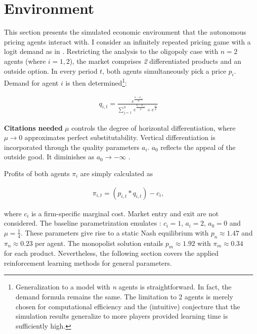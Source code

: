 \section{Environment}\label{enironment}

This section presents the simulated economic environment that the autonomous pricing agents interact with. I consider an infinitely repeated pricing game with a logit demand as in \textcite{calvano_artificial_2019}. Restricting the analysis to the oligopoly case with $n=2$ agents (where $i = 1,2$), the market comprises \emph{2} differentiated products and an outside option. In every period $t$, both agents simultaneously pick a price $p_i$. Demand for agent $i$ is then determined\footnote{Generalization to a model with \emph{n} agents is straightforward. In fact, the demand formula remains the same. The limitation to 2 agents is merely chosen for computational efficiency and the (intuitive) conjecture that the simulation results generalize to more players provided learning time is sufficiently high.}:

\begin{gather}\label{quantity}
q_{i,t}=\frac{e^{\frac{a_i - p_{i,t}}{\mu}}}{\sum_{j=1}^{n}~ e^{\frac{a_j-p_{j,t}}{\mu}}+e^{\frac{a_0}{\mu}}}
\end{gather}

\textbf{Citations needed}
$\mu$ controls the degree of horizontal differentiation, where $\mu \rightarrow 0$ approximates perfect substitutability. Vertical differentiation is incorporated through the quality parameters $a_i$. $a_0$ reflects the appeal of the outside good. It diminishes as $a_0 \rightarrow -\infty$ \parencite{anderson_logit_1992}. 

Profits of both agents $\pi_i$ are simply calculated as

\begin{gather}\label{profit}
\pi_{i,t} = (p_{i,t} * q_{i,t}) - c_i,
\end{gather}

where $c_i$ is a firm-specific marginal cost. Market entry and exit are not considered. The baseline parametrization emulates \textcite{calvano_artificial_2019}:
$c_i = 1$,
$a_i = 2$,
$a_0 = 0$ and
$\mu = \frac{1}{4}$. These parameters give rise to a static Nash equilibrium with $p_n \approx 1.47$ and $\pi_n \approx 0.23$ per agent. The monopolist solution entails $p_m \approx 1.92$ with $\pi_m \approx 0.34$ for each product. Nevertheless, the following section covers the applied reinforcement learning methods for general parameters.

